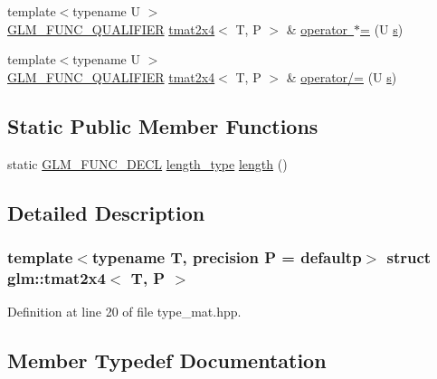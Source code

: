 \begin{DoxyCompactItemize}
\item 
{\footnotesize template$<$typename U $>$ }\\\mbox{\hyperlink{setup_8hpp_a33fdea6f91c5f834105f7415e2a64407}{G\+L\+M\+\_\+\+F\+U\+N\+C\+\_\+\+Q\+U\+A\+L\+I\+F\+I\+ER}} \mbox{\hyperlink{structglm_1_1tmat2x4}{tmat2x4}}$<$ T, P $>$ \& \mbox{\hyperlink{structglm_1_1tmat2x4_ad57111b0a12414933c700d2307dcc5cb}{operator $\ast$=}} (U \mbox{\hyperlink{glad_8h_af1b1d5edfea6a34daee7389b1b5810ad}{s}})
\item 
{\footnotesize template$<$typename U $>$ }\\\mbox{\hyperlink{setup_8hpp_a33fdea6f91c5f834105f7415e2a64407}{G\+L\+M\+\_\+\+F\+U\+N\+C\+\_\+\+Q\+U\+A\+L\+I\+F\+I\+ER}} \mbox{\hyperlink{structglm_1_1tmat2x4}{tmat2x4}}$<$ T, P $>$ \& \mbox{\hyperlink{structglm_1_1tmat2x4_ab5395e4e7c57f59d26790d2d640e4a81}{operator/=}} (U \mbox{\hyperlink{glad_8h_af1b1d5edfea6a34daee7389b1b5810ad}{s}})
\end{DoxyCompactItemize}
\subsection*{Static Public Member Functions}
\begin{DoxyCompactItemize}
\item 
static \mbox{\hyperlink{setup_8hpp_ab2d052de21a70539923e9bcbf6e83a51}{G\+L\+M\+\_\+\+F\+U\+N\+C\+\_\+\+D\+E\+CL}} \mbox{\hyperlink{structglm_1_1tmat2x4_a8d8156b982138c22047082ca7a8f9009}{length\+\_\+type}} \mbox{\hyperlink{structglm_1_1tmat2x4_ad8ebd12c7dd9f888960ac95f375d9701}{length}} ()
\end{DoxyCompactItemize}


\subsection{Detailed Description}
\subsubsection*{template$<$typename T, precision P = defaultp$>$\newline
struct glm\+::tmat2x4$<$ T, P $>$}



Definition at line 20 of file type\+\_\+mat.\+hpp.



\subsection{Member Typedef Documentation}
\mbox{\label{structglm_1_1tmat2x4_a9effcccd2c4c50c385e4c3a2fe2feedb}} 
